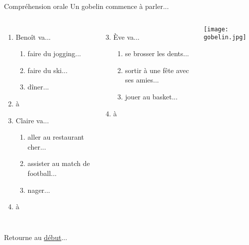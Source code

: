 \documentclass{beamer}
\begin{document}
  \begin{frame}{Compréhension orale}
    \hypertarget{orale}{}
    Un gobelin commence à parler...
    \begin{columns}[t]
        \begin{enumerate}
          \item Benoît va...
          \begin{enumerate}
            \item faire du jogging...
            \item \alert<2->{faire du ski...}
            \item dîner...
          \end{enumerate}
          \item[] à \underline{}
          \item Claire va...
          \begin{enumerate}
            \item \alert<4->{aller au restaurant cher...}
            \item assister au match de football...
            \item nager...
          \end{enumerate}
          \item[] à \underline{}
        \end{enumerate}
        \begin{enumerate}
          \setcounter{enumi}{2}
          \item Ève va...
          \begin{enumerate}
            \item \alert<6->{se brosser les dents...}
            \item sortir à une fête avec ses amies...
            \item jouer au basket...
          \end{enumerate}
          \item[] à \underline{}
        \end{enumerate}
        \begin{center}
          \texttt{[image: gobelin.jpg]}
        \end{center}
    \end{columns}
    Retourne au \hyperlink{début}{début}...
  \end{frame}
\end{document}
